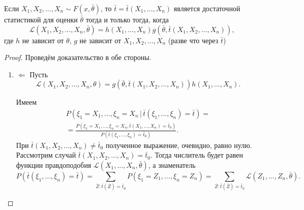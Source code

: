 \begin{theorem}
  Если $X_1, X_2, \dots, X_n \sim F(x, \bar\theta)$, то $\bar t = \bar t (X_1,
	\dots, X_n)$ является достаточной статистикой для оценки $\bar\theta$ тогда и
	только тогда, когда 
  \[
    \mathscr{L}(X_1, X_2, \dots, X_n, \bar\theta) = h(X_1, \dots, X_n)
		g(\bar\theta, \bar t (X_1, X_2, \dots, X_n)),
  \]
  где $h$ не зависит от $\theta$, $g$ не зависит от $X_1, X_2, \dots, X_n$
	(разве что через $\bar t$)
\end{theorem}

\begin{proof}
	Проведём доказательство в обе стороны.
	\begin{enumerate}
		\item $\boxed{\Leftarrow}$ Пусть
			\[
				\mathscr L(X_1, X_2, \ldots, X_n, \theta) = g\left(\bar \theta, \bar t(X_1,
				X_2, \ldots, X_n) \right)h(X_1, \ldots, X_n).
			\]

			Имеем
  \begin{multline*}
    P(\xi_1 = X_1, \dots, \xi_n = X_n \, | \, \bar t (\xi_1, \dots, \xi_n) = \bar t)
    = \\ = \frac{P(\xi_1=X_1, \dots, \xi_n = X_n, \bar t(X_1, \dots, X_n) = \bar
		t_0)}{P(\bar t(\xi_1, \dots, \xi_n) = \bar t_0)}.
  \end{multline*}
При $ \bar t(X_1, X_2, \ldots, X_n) \neq \bar t_0$ полученное выражение,
очевидно, равно нулю. Рассмотрим случай $ \bar t(X_1, X_2, \ldots, X_n) = \bar
t_0 $. Тогда числитель будет равен функции правдоподобия $ \mathscr L(X_1,
\ldots , X_n, \bar \theta) $, а знаменатель 
\[
		P(\bar t(\xi_1, \ldots, \xi_n) = \bar t) = \sum_{\bar Z \colon \bar t(\bar
		Z) = \bar t_0} P(\xi_1 = Z_1, \ldots, \xi_n = Z_n) = \sum_{\bar Z\colon \bar
		t(\bar Z) = \bar t_0}\mathscr L(Z_1, \ldots, Z_n, \bar \theta). 
\]


\end{enumerate}
\end{proof}
